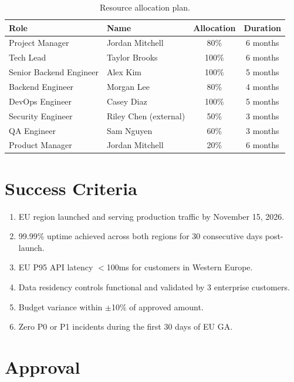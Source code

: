\documentclass[
    language=english,
    doctype=project-charter,
    institution=none,
]{../../omnilatex}
\begin{document}
\begin{table}[h]
    \centering
    \begin{tabular}{llcc}
        \toprule
        \textbf{Role} & \textbf{Name} & \textbf{Allocation} & \textbf{Duration} \\
        \midrule
        Project Manager         & Jordan Mitchell      & 80\%  & 6 months \\
        Tech Lead               & Taylor Brooks        & 100\% & 6 months \\
        Senior Backend Engineer & Alex Kim             & 100\% & 5 months \\
        Backend Engineer        & Morgan Lee           & 80\%  & 4 months \\
        DevOps Engineer         & Casey Diaz           & 100\% & 5 months \\
        Security Engineer       & Riley Chen (external) & 50\% & 3 months \\
        QA Engineer             & Sam Nguyen           & 60\%  & 3 months \\
        Product Manager         & Jordan Mitchell      & 20\%  & 6 months \\
        \bottomrule
    \end{tabular}
    \caption{Resource allocation plan.}
\end{table}

\section{Success Criteria}

\begin{enumerate}
    \item EU region launched and serving production traffic by November 15, 2026.
    \item 99.99\% uptime achieved across both regions for 30 consecutive days
          post-launch.
    \item EU P95 API latency $<$100ms for customers in Western Europe.
    \item Data residency controls functional and validated by 3 enterprise
          customers.
    \item Budget variance within $\pm$10\% of approved amount.
    \item Zero P0 or P1 incidents during the first 30 days of EU GA.
\end{enumerate}

\section{Approval}
\end{document}

